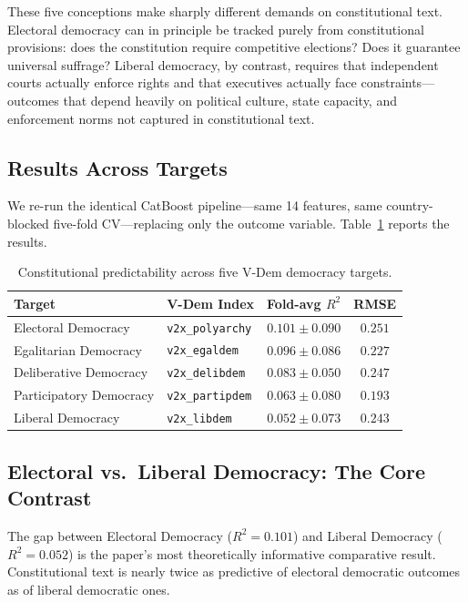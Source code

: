 \documentclass[9pt,twoside]{pnas-new}
\begin{document}
These five conceptions make sharply different demands on constitutional text. Electoral democracy can in principle be tracked purely from constitutional provisions: does the constitution require competitive elections? Does it guarantee universal suffrage? Liberal democracy, by contrast, requires that independent courts actually enforce rights and that executives actually face constraints---outcomes that depend heavily on political culture, state capacity, and enforcement norms not captured in constitutional text.

\subsection*{Results Across Targets}

We re-run the identical CatBoost pipeline---same 14 features, same country-blocked five-fold CV---replacing only the outcome variable. Table~\ref{tab:robustness} reports the results.

\begin{table}[t!]
\centering
\caption{Constitutional predictability across five V-Dem democracy targets.}
\label{tab:robustness}
\begin{tabular}{llcc}
\textbf{Target} & \textbf{V-Dem Index} & \textbf{Fold-avg } $R^2$ & \textbf{RMSE} \\
\midrule
Electoral Democracy     & \texttt{v2x\_polyarchy}  & $0.101 \pm 0.090$ & $0.251$ \\
Egalitarian Democracy   & \texttt{v2x\_egaldem}    & $0.096 \pm 0.086$ & $0.227$ \\
Deliberative Democracy  & \texttt{v2x\_delibdem}   & $0.083 \pm 0.050$ & $0.247$ \\
Participatory Democracy & \texttt{v2x\_partipdem}  & $0.063 \pm 0.080$ & $0.193$ \\
Liberal Democracy       & \texttt{v2x\_libdem}     & $0.052 \pm 0.073$ & $0.243$ \\
\bottomrule
\end{tabular}
\end{table}

\subsection*{Electoral vs.\ Liberal Democracy: The Core Contrast}

The gap between Electoral Democracy ($R^2 = 0.101$) and Liberal Democracy ($R^2 = 0.052$) is the paper's most theoretically informative comparative result. Constitutional text is nearly twice as predictive of electoral democratic outcomes as of liberal democratic ones.
\end{document}

